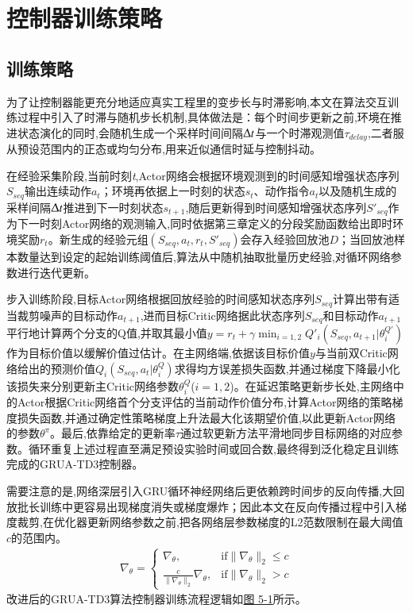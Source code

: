 \documentclass{scrbook}
\begin{document}
{\section{\label{ref-072}控制器训练策略\label{mark-5.1}}

\subsection{\label{ref-073}训练策略\label{mark-5.1.1}}

为了让控制器能更充分地适应真实工程里的变步长与时滞影响,本文在算法交互训练过程中引入了时滞与随机步长机制,具体做法是：每个时间步更新之前,环境在推进状态演化的同时,会随机生成一个采样时间间隔$\Updelta t$与一个时滞观测值$\tau _{\textit{delay}}$,二者服从预设范围内的正态或均匀分布,用来近似通信时延与控制抖动。

在经验采集阶段,当前时刻\textit{t},Actor网络会根据环境观测到的时间感知增强状态序列$S_{seq}$输出连续动作$a_{t}$；环境再依据上一时刻的状态$s_{t}$、动作指令$a_{t}$以及随机生成的采样间隔$\Updelta t$推进到下一时刻状态$s_{t+1}$,随后更新得到时间感知增强状态序列$S'_{seq}$作为下一时刻Actor网络的观测输入,同时依据第三章定义的分段奖励函数给出即时环境奖励$r_{t}$。新生成的经验元组$(S_{seq},a_{t},r_{t},S'_{seq})$会存入经验回放池$D$；当回放池样本数量达到设定的起始训练阈值后,算法从中随机抽取批量历史经验,对循环网络参数进行迭代更新。

步入训练阶段,目标Actor网络根据回放经验的时间感知状态序列$S_{seq}$计算出带有适当裁剪噪声的目标动作$a_{t+1}$,进而目标Critic网络据此状态序列$S_{seq}$和目标动作$a_{t+1}$平行地计算两个分支的Q值,并取其最小值$y=r_{t}+\gamma \min _{i=1,2}Q'_{i}(S_{seq},a_{t+1}| \theta _{i}^{Q'})$作为目标价值以缓解价值过估计。在主网络端,依据该目标价值$y$与当前双Critic网络给出的预测价值$Q_{i}(S_{seq},a_{t}| \theta _{i}^{Q})$求得均方误差损失函数,并通过梯度下降最小化该损失来分别更新主Critic网络参数$\theta _{i}^{Q}$($i=1,2$)。在延迟策略更新步长处,主网络中的Actor根据Critic网络首个分支评估的当前动作价值分布,计算Actor网络的策略梯度损失函数,并通过确定性策略梯度上升法最大化该期望价值,以此更新Actor网络的参数$\theta ^{\pi }$。最后,依靠给定的更新率$\tau $通过软更新方法平滑地同步目标网络的对应参数。循环重复上述过程直至满足预设实验时间或回合数,最终得到泛化稳定且训练完成的GRUA-TD3控制器。

需要注意的是,网络深层引入GRU循环神经网络后更依赖跨时间步的反向传播,大回放批长训练中更容易出现梯度消失或梯度爆炸；因此本文在反向传播过程中引入梯度裁剪,在优化器更新网络参数之前,把各网络层参数梯度的L2范数限制在最大阈值$c$的范围内。
\begin{align}
\tag{5-1}
\nabla _{\theta }=\begin{cases} \nabla _{\theta }, & \mathrm{if}\| \nabla _{\theta }\| _{2}\leq c\\
\frac{c}{\| \nabla _{\theta }\| _{2}}\nabla _{\theta }, & \mathrm{if}\| \nabla _{\theta }\| _{2}> c
\end{cases} 
\end{align}
改进后的GRUA-TD3算法控制器训练流程逻辑如{\hyperref[ref-074]{图 5-1}}所示。

}
\end{document}
